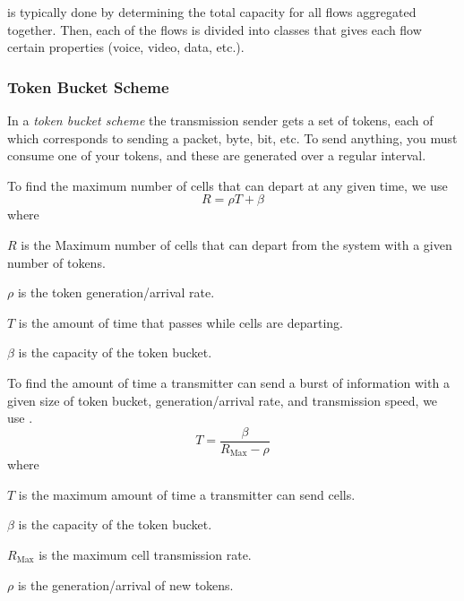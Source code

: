  is typically done by determining the total capacity for all flows aggregated together.
Then, each of the flows is divided into classes that gives each flow certain properties (voice, video, data, etc.).

\begin{algorithm}[H]
  \DontPrintSemicolon{}
  \BlankLine{}

\end{algorithm}

\subsubsection{Token Bucket Scheme}\label{subsubsec:Token_Bucket_Scheme}
\begin{definition}\label{def:Token_Bucket_Scheme}
  In a \emph{token bucket scheme} the transmission sender gets a set of tokens, each of which corresponds to sending a packet, byte, bit, etc.
  To send anything, you must consume one of your tokens, and these are generated over a regular interval.
\end{definition}

To find the maximum number of cells that can depart at any given time, we use 
\begin{equation}\label{eq:Token_Bucket_Max_Cells}
  R = \rho T + \beta
\end{equation}
where
\begin{description}[noitemsep]
\item $R$ is the Maximum number of cells that can depart from the system with a given number of tokens.
\item $\rho$ is the token generation/arrival rate.
\item $T$ is the amount of time that passes while cells are departing.
\item $\beta$ is the capacity of the token bucket.
\end{description}

To find the amount of time a transmitter can send a burst of information with a given size of token bucket, generation/arrival rate, and transmission speed, we use .
\begin{equation}\label{eq:Token_Bucket_Max_Burst_Time}
  T = \frac{\beta}{R_{\mathrm{Max}}-\rho}
\end{equation}
where
\begin{description}[noitemsep]
\item $T$ is the maximum amount of time a transmitter can send cells.
\item $\beta$ is the capacity of the token bucket.
\item $R_{\mathrm{Max}}$ is the maximum cell transmission rate.
\item $\rho$ is the generation/arrival of new tokens.
\end{description}


